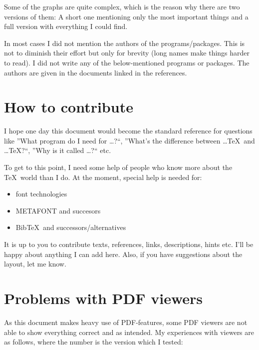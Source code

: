 Some of the graphs are quite complex, which is the reason why there are two versions of them: A short one mentioning only the most important things and a full version with everything I could find.

In most cases I did not mention the authors of the programs/packages. This is not to diminish their effort but only for brevity (long names make things harder to read). I did not write any of the below-mentioned programs or packages. The authors are given in the documents linked in the references.

\section{How to contribute}
I hope one day this document would become the standard reference for questions like ”What program do I need for …?“, ”What's the difference between …\TeX\ and …\TeX?“, ”Why is it called …?“ etc.

To get to this point, I need some help of people who know more about the \TeX\ world than I do. At the moment, special help is needed for:
\begin{itemize}
\item font technologies
\item METAFONT and succesors
\item Bib\TeX\ and successors/alternatives
\end{itemize}

It is up to you to contribute texts, references, links, descriptions, hints etc. I'll be happy about anything I can add here. Also, if you have suggestions about the layout, let me know.

\section{Problems with PDF viewers}
As this document makes heavy use of PDF-features, some PDF viewers are not able to show everything correct and as intended. My experiences with viewers are as follows, where the number is the version which I tested:

